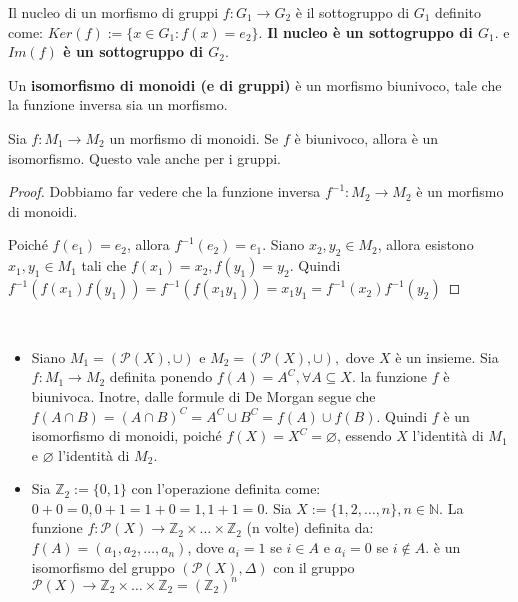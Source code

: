 \documentclass[../main.tex]{subfiles}
\begin{document}
\begin{remark}
    Il nucleo di un morfismo di gruppi $f: G_1 \rightarrow G_2$ è il sottogruppo di $G_1$ definito come: $Ker(f):= \{x \in G_1 : f(x) = e_2\}$.
    \textbf{Il nucleo è un sottogruppo di $G_1$}. e \textbf{$Im(f)$ è un sottogruppo di $G_2$}.
\end{remark}

\begin{definition}[Isomorfismo]
    Un \textbf{isomorfismo di monoidi (e di gruppi)} è un morfismo biunivoco, tale che la funzione inversa sia un morfismo.
\end{definition}

\begin{proposition}
    Sia $f: M_1 \rightarrow M_2$ un morfismo di monoidi. Se $f$ è biunivoco, allora è un isomorfismo. Questo vale anche per i gruppi.
\end{proposition}

\begin{proof}
    Dobbiamo far vedere che la funzione inversa $f^{-1} : M_2 \rightarrow M_2$ è un morfismo di monoidi.

    Poiché $f(e_1) = e_2$, allora $f^{-1}(e_2) = e_1$.
    Siano $x_2,y_2 \in M_2$, allora esistono $x_1,y_1 \in M_1$ tali che $f(x_1)= x_2 , f(y_1)=y_2$.
    Quindi $f^{-1} (f(x_1)f(y_1)) = f^{-1}(f(x_1 y_1)) = x_1 y_1 = f^{-1}(x_2) f^{-1}(y_2)$
\end{proof}

\begin{example}
    \
    \begin{itemize}
        \item Siano $M_1 = (\mathcal{P}(X), \cup) \text{ e } M_2 = (\mathcal{P}(X), \cup), \text{ dove } X$
              è un insieme. Sia $f : M_1 \rightarrow M_2$ definita ponendo $f(A) = A^C , \forall A \subseteq X$.
              la funzione $f$ è biunivoca. Inotre, dalle formule di De Morgan segue che $f(A \cap B) =
                  (A \cap B)^C = A^C \cup B^C = f(A) \cup f(B)$. Quindi $f$ è un isomorfismo di monoidi, poiché
              $f(X) = X^C = \varnothing$, essendo $X$ l'identità di $M_1$ e $\varnothing$ l'identità di $M_2$.
        \item Sia $\mathbb{Z}_2 := \{0,1\}$ con l'operazione definita come: $0+0=0, 0+1=1+0=1, 1+1=0$.
              Sia $X := \{1,2,\ldots,n\}, n \in \mathbb{N}$. La funzione $f: \mathcal{P}(X) \rightarrow
                  \mathbb{Z}_2 \times \ldots \times \mathbb{Z}_2$ (n volte) definita da: $f(A) = (a_1,a_2,\ldots,a_n)$,
              dove $a_i = 1$ se $i \in A$ e $a_i = 0$ se $i \notin A$. \newline è un isomorfismo del gruppo
              $(\mathcal{P}(X), \Delta)$ con il gruppo $\mathcal{P}(X) \rightarrow \mathbb{Z}_2 \times \ldots
                  \times \mathbb{Z}_2 = (\mathbb{Z}_2)^n$
    \end{itemize}
\end{example}
\end{document}
